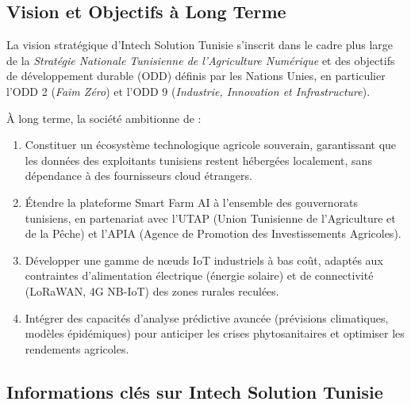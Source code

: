 \documentclass[12pt, a4paper]{report}
\begin{document}
\subsection{Vision et Objectifs à Long Terme}

La vision stratégique d'Intech Solution Tunisie s'inscrit dans le cadre plus large de la \textit{Stratégie Nationale Tunisienne de l'Agriculture Numérique} et des objectifs de développement durable (ODD) définis par les Nations Unies, en particulier l'ODD 2 (\textit{Faim Zéro}) et l'ODD 9 (\textit{Industrie, Innovation et Infrastructure}).

À long terme, la société ambitionne de :
\begin{enumerate}[leftmargin=*, label=\textcolor{primary}{\arabic*.}]
    \item Constituer un écosystème technologique agricole souverain, garantissant que les données des exploitants tunisiens restent hébergées localement, sans dépendance à des fournisseurs cloud étrangers.
    \item Étendre la plateforme Smart Farm AI à l'ensemble des gouvernorats tunisiens, en partenariat avec l'UTAP (Union Tunisienne de l'Agriculture et de la Pêche) et l'APIA (Agence de Promotion des Investissements Agricoles).
    \item Développer une gamme de nœuds IoT industriels à bas coût, adaptés aux contraintes d'alimentation électrique (énergie solaire) et de connectivité (LoRaWAN, 4G NB-IoT) des zones rurales reculées.
    \item Intégrer des capacités d'analyse prédictive avancée (prévisions climatiques, modèles épidémiques) pour anticiper les crises phytosanitaires et optimiser les rendements agricoles.
\end{enumerate}

\subsection{Informations clés sur Intech Solution Tunisie}
\end{document}
